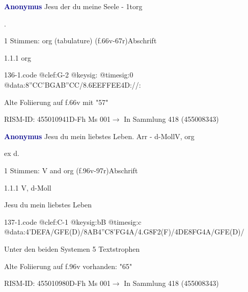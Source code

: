 \documentclass[twocolumn, 12pt]{book}
\begin{document}
\par \vspace{16pt} \textcolor{darkblue}{\textbf{Anonymus  }}\hfillplus{\textbf{[136]}}\newline Jesu der du meine Seele - 1t\newline org
\par \begin{itshape}[f.66v, at left:] .\end{itshape} 
\par \textcolor{darkblue}{}  1 Stimmen: org (tabulature)  (f.66v-67r)\newline Abschrift
\par 1.1.1  org  
\begin{filecontents*}{136-1.code}
@clef:G-2
@keysig:
@timesig:0
@data:{8''CC'BG}{AB''CC}/{8.6EEFF}{EE}4D://:
\end{filecontents*}
\newline %
\par Alte Foliierung auf f.66v mit "57"
\par RISM-ID: 455010941\newline D-Fh  Ms 001\newline $\rightarrow$ In Sammlung 418 (455008343)
      
\par \vspace{16pt} \textcolor{darkblue}{\textbf{Anonymus  }}\hfillplus{\textbf{[137]}}\newline Jesu du mein liebstes Leben. Arr - d-Moll\newline V, org
\par \begin{itshape}[f.96v, at left:] ex d.\end{itshape} 
\par \textcolor{darkblue}{}  1 Stimmen: V and org  (f.96v-97r)\newline Abschrift
\par 1.1.1  V, d-Moll\newline \begin{footnotesize} Jesu du mein liebstes Leben \end{footnotesize}  
\begin{filecontents*}{137-1.code}
@clef:C-1
@keysig:bB
@timesig:c
@data:4'DEFA/GFE(D)/{8AB}4''C{8'FG}4A/4.G8F2(F)/4DE{8FG}4A/GFE(D)/
\end{filecontents*}
\newline %
\par Unter den beiden Systemen 5 Textstrophen
\par Alte Foliierung auf f.96v vorhanden: "65"
\par RISM-ID: 455010980\newline D-Fh  Ms 001\newline $\rightarrow$ In Sammlung 418 (455008343)
      
\end{document}
